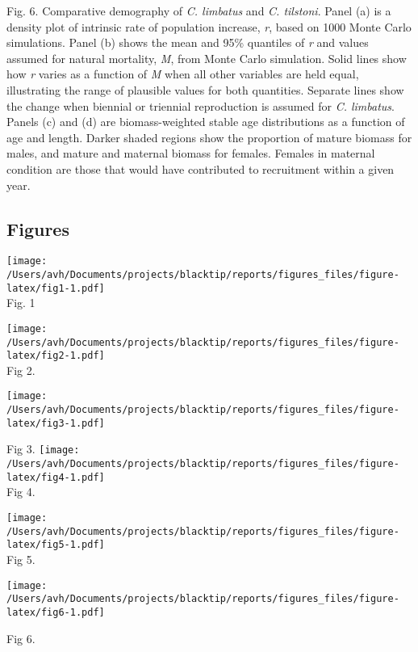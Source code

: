 \documentclass[]{article}
\begin{document}
Fig. 6. Comparative demography of \emph{C. limbatus} and \emph{C.
tilstoni}. Panel (a) is a density plot of intrinsic rate of population
increase, \emph{r}, based on 1000 Monte Carlo simulations. Panel (b)
shows the mean and 95\% quantiles of \emph{r} and values assumed for
natural mortality, \emph{M}, from Monte Carlo simulation. Solid lines
show how \emph{r} varies as a function of \emph{M} when all other
variables are held equal, illustrating the range of plausible values for
both quantities. Separate lines show the change when biennial or
triennial reproduction is assumed for \emph{C. limbatus}. Panels (c) and
(d) are biomass-weighted stable age distributions as a function of age
and length. Darker shaded regions show the proportion of mature biomass
for males, and mature and maternal biomass for females. Females in
maternal condition are those that would have contributed to recruitment
within a given year.

\newpage

\hypertarget{figures}{%
\subsection{Figures}\label{figures}}

\texttt{[image: /Users/avh/Documents/projects/blacktip/reports/figures\_files/figure-latex/fig1-1.pdf]}\\
Fig. 1

\newpage

\texttt{[image: /Users/avh/Documents/projects/blacktip/reports/figures\_files/figure-latex/fig2-1.pdf]}\\
Fig 2.

\newpage

\texttt{[image: /Users/avh/Documents/projects/blacktip/reports/figures\_files/figure-latex/fig3-1.pdf]}

Fig 3. \newpage
\texttt{[image: /Users/avh/Documents/projects/blacktip/reports/figures\_files/figure-latex/fig4-1.pdf]}\\
Fig 4.

\newpage

\texttt{[image: /Users/avh/Documents/projects/blacktip/reports/figures\_files/figure-latex/fig5-1.pdf]}\\
Fig 5.

\newpage

\texttt{[image: /Users/avh/Documents/projects/blacktip/reports/figures\_files/figure-latex/fig6-1.pdf]}

Fig 6.
\end{document}
